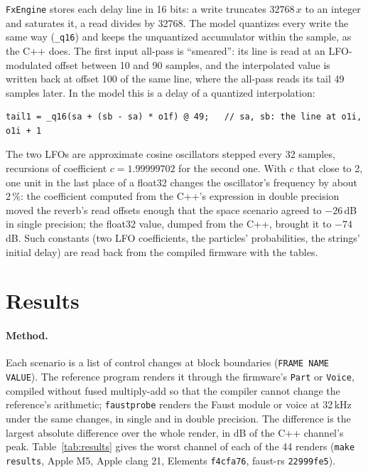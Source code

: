 \documentclass[10pt,a4paper,twocolumn]{article}
\newcommand{\faustrs}{faust-rs}
\newcommand{\probe}{\texttt{faustprobe}}
\newcommand{\code}[1]{\texttt{#1}}
\begin{document}
\code{FxEngine} stores each delay line in 16 bits: a write truncates $32768\,x$ to an integer and saturates it, a read divides by 32768. The model quantizes every write the same way (\code{\_q16}) and keeps the unquantized accumulator within the sample, as the C++ does. The first input all-pass is ``smeared'': its line is read at an LFO-modulated offset between 10 and 90 samples, and the interpolated value is written back at offset 100 of the same line, where the all-pass reads its tail 49 samples later. In the model this is a delay of a quantized interpolation:
\begin{lstlisting}
tail1 = _q16(sa + (sb - sa) * o1f) @ 49;   // sa, sb: the line at o1i, o1i + 1
\end{lstlisting}
The two LFOs are approximate cosine oscillators stepped every 32 samples, recursions of coefficient $c = 1.99999702$ for the second one. With $c$ that close to 2, one unit in the last place of a float32 changes the oscillator's frequency by about 2\,\%: the coefficient computed from the C++'s expression in double precision moved the reverb's read offsets enough that the space scenario agreed to $-26$\,dB in single precision; the float32 value, dumped from the C++, brought it to $-74$\,dB. Such constants (two LFO coefficients, the particles' probabilities, the strings' initial delay) are read back from the compiled firmware with the tables.

\section{Results}
\label{sec:results}

\paragraph{Method.} Each scenario is a list of control changes at block boundaries (\code{FRAME NAME VALUE}). The reference program renders it through the firmware's \code{Part} or \code{Voice}, compiled without fused multiply-add so that the compiler cannot change the reference's arithmetic; \probe{} renders the Faust module or voice at 32\,kHz under the same changes, in single and in double precision. The difference is the largest absolute difference over the whole render, in dB of the C++ channel's peak. Table~\ref{tab:results} gives the worst channel of each of the 44 renders (\code{make results}, Apple M5, Apple clang 21, Elements \code{f4cfa76}, \faustrs{} \code{22999fe5}).
\end{document}
